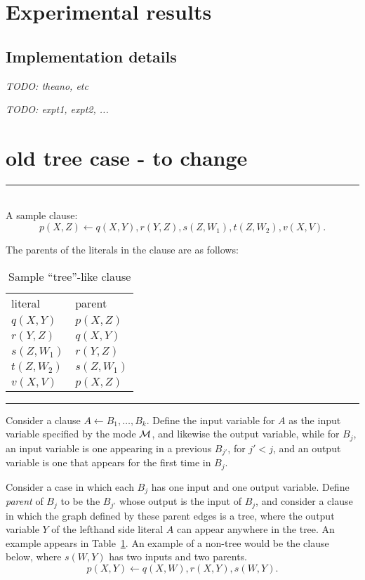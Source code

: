 \documentclass[12pt]{article}
\newcommand{\yy}[1]{\textit{TODO: {#1}}}
\newcommand{\trm}[1]{\textit{#1}}
\begin{document}
\section{Experimental results}

\subsection{Implementation details}

\yy{theano, etc}

\yy{expt1, expt2, ...}

\section{old tree case - to change}

\begin{table}
\hrule

~\\

A sample clause:
\[ p(X,Z) \leftarrow q(X,Y),r(Y,Z),s(Z,W_1),t(Z,W_2),v(X,V).
\] 

The parents of the literals in the clause are as follows:

\begin{tabular}{ll}
literal & parent\\
$q(X,Y)$ & $p(X,Z)$ \\
$r(Y,Z)$ & $q(X,Y)$ \\
$s(Z,W_1)$ & $r(Y,Z)$ \\
$t(Z,W_2)$ & $s(Z,W_1)$ \\
$v(X,V)$ & $p(X,Z)$
\end{tabular}

\caption{Sample ``tree''-like clause}
\label{tab:tree}
\hrule
\end{table}

Consider a clause $A\leftarrow B_1,\ldots,B_k$.  Define the input
variable for $A$ as the input variable specified by the mode ${\cal
  M}$, and likewise the output variable, while for $B_j$, an input
variable is one appearing in a previous $B_{j'}$, for $j'<j$, and an
output variable is one that appears for the first time in $B_{j}$.

Consider a case in which each $B_j$ has one input and one output
variable.  Define \trm{parent} of $B_j$ to be the $B_{j'}$ whose
output is the input of $B_j$, and consider a clause in which the graph
defined by these parent edges is a tree, where the output variable $Y$
of the lefthand side literal $A$ can appear anywhere in the tree.  An
example appears in Table~\ref{tab:tree}. An example of a non-tree
would be the clause below, where $s(W,Y)$ has two inputs and two
parents.
\[ p(X,Y) \leftarrow q(X,W),r(X,Y),s(W,Y).
\] 
\end{document}
